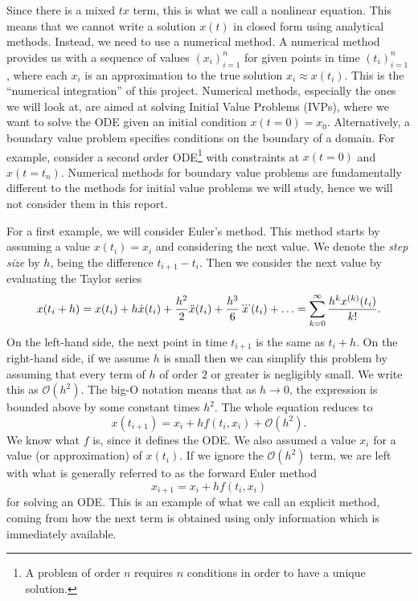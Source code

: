 Since there is a mixed $tx$ term, this is what we call a nonlinear equation.
This means that we cannot write a solution $x(t)$ in closed form using analytical methods.
Instead, we need to use a numerical method.
A numerical method provides us with a sequence of values $(x_i)_{i=1}^n$ for given points in time $(t_i)_{i=1}^n$, where each $x_i$ is an approximation to the true solution $x_i \approx x(t_i)$.
This is the ``numerical integration'' of this project.
Numerical methods, especially the ones we will look at, are aimed at solving Initial Value Problems (IVPs), where we want to solve the ODE given an initial condition $x(t=0) = x_0$.
Alternatively, a boundary value problem specifies conditions on the boundary of a domain. For example, consider a second order ODE\footnote{
    A problem of order $n$ requires $n$ conditions in order to have a unique solution.
} with constraints at $x(t=0)$ and $x(t = t_n)$.
Numerical methods for boundary value problems are fundamentally different to the methods for initial value problems we will study, hence we will not consider them in this report.

For a first example, we will consider Euler's method. This method starts by assuming a value $x(t_i) = x_i$ and considering the next value.
We denote the \textit{step size} by $h$, being the difference $t_{i+1} - t_i$.
Then we consider the next value by evaluating the Taylor series
\begin{equation*}
    x(t_i + h) = x(t_i) + h \dot{x}(t_i) + \frac{h^2}{2}\ddot{x}(t_i) + \frac{h^3}{6}\dddot{x}(t_i) + \mathellipsis = \sum_{k=0}^{\infty} \frac{h^k x^{(k)}(t_i)}{k!}.
\end{equation*}
On the left-hand side, the next point in time $t_{i+1}$ is the same as $t_i + h$.
On the right-hand side, if we assume $h$ is small then we can simplify this problem by assuming that every term of $h$ of order $2$ or greater is negligibly small.
We write this as $\mathcal{O}(h^2)$. The big-O notation means that as $h \rightarrow 0$, the expression is bounded above by some constant times $h^2$.
The whole equation reduces to
\begin{equation*}
    x(t_{i+1}) = x_i + hf(t_i, x_i) + \mathcal{O}(h^2).
\end{equation*}
We know what $f$ is, since it defines the ODE. We also assumed a value $x_i$ for a value (or approximation) of $x(t_i)$.
If we ignore the $\mathcal{O}(h^2)$ term, we are left with what is generally referred to as the forward Euler method
\begin{equation}
    x_{i+1} = x_i + h f(t_i, x_i)
\end{equation}
for solving an ODE.
This is an example of what we call an explicit method, coming from how the next term is obtained using only information which is immediately available.

